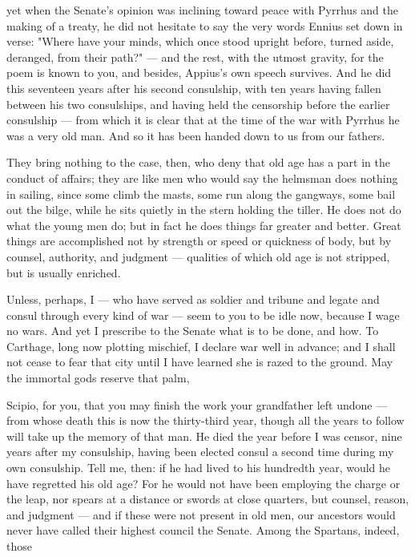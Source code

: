  yet when the Senate's opinion was inclining toward peace with Pyrrhus and the making of a treaty, he did not hesitate to say the very words Ennius set down in verse: "Where have your minds, which once stood upright before, turned aside, deranged, from their path?" — and the rest, with the utmost gravity, for the poem is known to you, and besides, Appius's own speech survives. And he did this seventeen years after his second consulship, with ten years having fallen between his two consulships, and having held the censorship before the earlier consulship — from which it is clear that at the time of the war with Pyrrhus he was a very old man. And so it has been handed down to us from our fathers.

 They bring nothing to the case, then, who deny that old age has a part in the conduct of affairs; they are like men who would say the helmsman does nothing in sailing, since some climb the masts, some run along the gangways, some bail out the bilge, while he sits quietly in the stern holding the tiller. He does not do what the young men do; but in fact he does things far greater and better. Great things are accomplished not by strength or speed or quickness of body, but by counsel, authority, and judgment — qualities of which old age is not stripped, but is usually enriched.

 Unless, perhaps, I — who have served as soldier and tribune and legate and consul through every kind of war — seem to you to be idle now, because I wage no wars. And yet I prescribe to the Senate what is to be done, and how. To Carthage, long now plotting mischief, I declare war well in advance; and I shall not cease to fear that city until I have learned she is razed to the ground. May the immortal gods reserve that palm,

 Scipio, for you, that you may finish the work your grandfather left undone — from whose death this is now the thirty-third year, though all the years to follow will take up the memory of that man. He died the year before I was censor, nine years after my consulship, having been elected consul a second time during my own consulship. Tell me, then: if he had lived to his hundredth year, would he have regretted his old age? For he would not have been employing the charge or the leap, nor spears at a distance or swords at close quarters, but counsel, reason, and judgment — and if these were not present in old men, our ancestors would never have called their highest council the Senate. Among the Spartans, indeed, those

